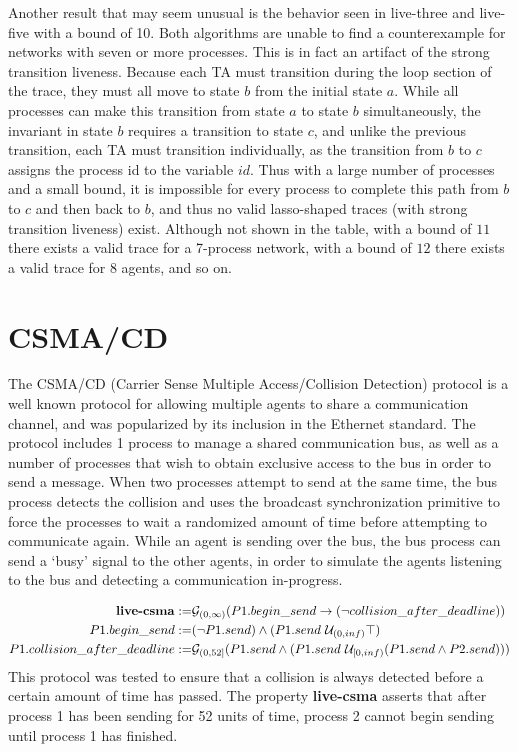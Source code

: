 \documentclass[a4paper,11pt]{report}
\theoremstyle{definition}
\begin{document}
Another result that may seem unusual is the behavior seen in live-three and
live-five with a bound of 10. Both algorithms are unable to find a
counterexample for networks with seven or more processes. This is in fact an
artifact of the strong transition liveness. Because each TA must transition
during the loop section of the trace, they must all move to state $b$ from the
initial state $a$. While all processes can make this transition from state $a$
to state $b$ simultaneously, the invariant in state $b$ requires a transition to
state $c$, and unlike the previous transition, each TA must transition
individually, as the transition from $b$ to $c$ assigns the process id to the
variable $id$. Thus with a large number of processes and a small bound, it is
impossible for every process to complete this path from $b$ to $c$ and then back
to $b$, and thus no valid lasso-shaped traces (with strong transition liveness)
exist. Although not shown in the table, with a bound of $11$ there exists a
valid trace for a 7-process network, with a bound of $12$ there exists a valid
trace for 8 agents, and so on.

\section{CSMA/CD}\label{evaluation-csma}

The CSMA/CD (Carrier Sense Multiple Access/Collision Detection) protocol is a
well known protocol for allowing multiple agents to share a communication
channel, and was popularized by its inclusion in the Ethernet standard. The
protocol includes 1 process to manage a shared communication bus, as well as a
number of processes that wish to obtain exclusive access to the bus in order to
send a message. When two processes attempt to send at the same time, the bus
process detects the collision and uses the broadcast synchronization primitive
to force the processes to wait a randomized amount of time before attempting to
communicate again. While an agent is sending over the bus, the bus process can
send a `busy' signal to the other agents, in order to simulate the agents
listening to the bus and detecting a communication in-progress.

\begin{align*}
  \text{\textbf{live-csma}} := & \mathcal{G}_{(0,\infty)}(P1.begin\_send \rightarrow (\neg collision\_after\_deadline)) \\
  P1.begin\_send := & (\neg P1.send) \land (P1.send\ \mathcal{U}_{(0,inf)} \top) \\
  P1.collision\_after\_deadline := & \mathcal{G}_{(0,52]}(P1.send \land (P1.send\ \mathcal{U}_{ [0,inf) } (P1.send \land P2.send))) \\
\end{align*}
This protocol was tested to ensure that a collision is always detected before a
certain amount of time has passed.
The property \textbf{live-csma} asserts that after process 1 has been sending
for 52 units of time, process 2 cannot begin sending until process 1 has finished.
\end{document}
